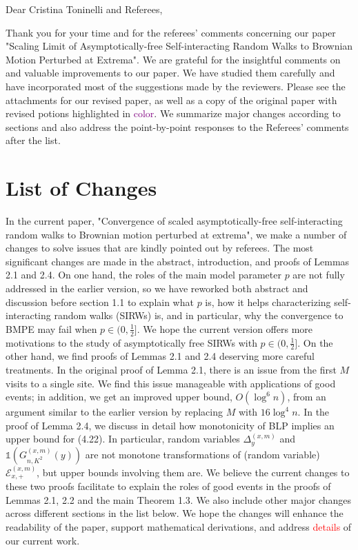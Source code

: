 \documentclass[11pt,a4paper]{article}
\numberwithin{equation}{section}
\newcommand{\edt}[1]{\textcolor{purple}{#1}} %
\def\TBF#1{\textcolor{red}{#1}} %
\begin{document}
	\noindent Dear Cristina Toninelli and Referees,
	
	Thank you for your time and for the referees' comments concerning our paper "Scaling Limit of Asymptotically-free Self-interacting
	Random Walks to Brownian Motion Perturbed at
	Extrema". We are grateful for the insightful comments on and valuable improvements to our paper. We have studied them carefully and have incorporated most of the suggestions made by the reviewers. Please see the attachments for our revised paper, as well as a copy of the original paper with revised potions highlighted in \edt{color}.
	We summarize major changes according to sections and also address the point-by-point responses to the Referees' comments after the list.
	
	\section*{List of Changes}
	In the current paper, "Convergence of scaled asymptotically-free
	self-interacting random walks to Brownian motion
	perturbed at extrema", we make a number of changes to solve issues that are kindly pointed out by referees.
	The most significant changes are made in the abstract, introduction, and proofs of Lemmas 2.1 and 2.4. On one hand, the roles of the main model parameter $p$ are not fully addressed in the earlier version, so we have reworked both abstract and discussion before section 1.1
	to explain what $p$ is, how it helps characterizing self-interacting random walks (SIRWs) is, and in particular, why the convergence to BMPE may fail when $p\in (0,\frac{1}{2}]$. We hope the current version offers more motivations to the study of asymptotically free SIRWs with $p\in (0,\frac{1}{2}]$. On the other hand, we find proofs of Lemmas 2.1 and 2.4 deserving more careful treatments. In the original proof of Lemma 2.1, there is an issue from the first $M$ visits to a single site. We find this issue manageable with applications of good events; in addition, we get an improved upper bound, $O(\log^6 n)$, from an  argument similar to the earlier version by replacing $M$ with $16\log^4 n$. In the proof of Lemma 2.4, we discuss in detail how monotonicity of BLP implies an upper bound for (4.22). In particular, random variables $\Delta_{y}^{(x,m)}$ and $\mathbb{1}\left(G^{(x,m)}_{n,K^2}(y) \right)$ are not monotone transformations of (random variable) $\mathcal{E}^{(x,m)}_{x,+}$, but upper bounds involving them are.  We believe the current changes to these two proofs facilitate to explain the roles of good events in the proofs of Lemmas 2.1, 2.2 and the main Theorem 1.3.   
	We also include other major changes across different sections in the list below. We hope the changes will enhance the readability of the paper, support mathematical derivations, and address \TBF{details} of our current work.
	
\end{document}
